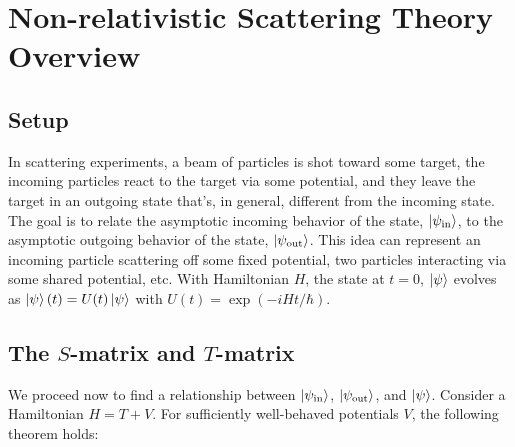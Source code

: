 \chapter{Non-relativistic Scattering Theory Overview}
\section{Setup}
In scattering experiments, a beam of particles is shot toward some target, the incoming particles react to the target via some potential, and they leave the target in an outgoing state that's, in general, different from the incoming state. The goal is to relate the asymptotic incoming behavior of the state, $\ket{\psi_\text{in}}$, to the asymptotic outgoing behavior of the state, $\ket{\psi_\text{out}}$. This idea can represent an incoming particle scattering off some fixed potential, two particles interacting via some shared potential, etc. With Hamiltonian $H$, the state at $t=0$, $\ket{\psi}$ evolves as $\ket{\psi}(t)=U(t)\ket{\psi}$ with $U(t)=\exp(-iHt/\hbar)$.
\section{\texorpdfstring{The $S$-matrix and $T$-matrix}{The S matrix and T matrix}}
We proceed now to find a relationship between $\ket{\psi_\text{in}}$, $\ket{\psi_\text{out}}$, and $\ket{\psi}$. Consider a Hamiltonian $H=T+V$. For sufficiently well-behaved potentials $V$, the following theorem holds:
